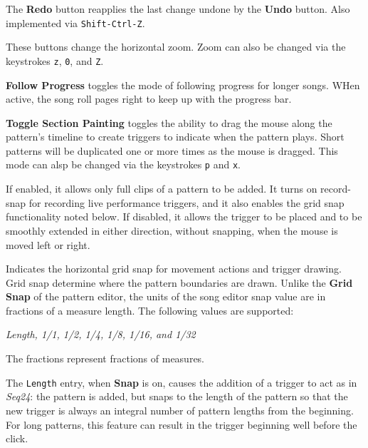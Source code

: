    The \textbf{Redo} button reapplies the last change undone by
   the \textbf{Undo} button.
   Also implemented via \texttt{Shift-Ctrl-Z}.

   These buttons change the horizontal zoom.
   Zoom can also be changed via the keystrokes \texttt{z}, \texttt{0},
   and \texttt{Z}.

   \textbf{Follow Progress} toggles the mode of following progress
   for longer songs.  WHen active, the song roll pages right to keep up with
   the progress bar.

   \textbf{Toggle Section Painting} toggles the ability
   to drag the mouse along the pattern's timeline to create triggers
   to indicate when the pattern plays.
   Short patterns will be duplicated one or more times as
   the mouse is dragged.
   This mode can alsp be changed via the keystrokes \texttt{p} and
   \texttt{x}.

   If enabled, it allows only full clips of a pattern to be added.
   It turns on record-snap for recording live performance triggers,
   and it also enables the grid snap functionality noted below.
   If disabled, it allows the trigger to be placed and to be smoothly extended
   in either direction, without snapping, when the mouse is moved left or
   right.

   Indicates the horizontal grid snap for movement actions and trigger drawing.
   Grid snap determine where the pattern boundaries are drawn.
   Unlike the \textbf{Grid Snap} of the pattern editor, the units
   of the song editor snap value are in fractions of a measure length.
   The following values are supported:

   \textsl{Length, 1/1, 1/2, 1/4, 1/8, 1/16, and 1/32}

   The fractions represent fractions of measures.

   The \texttt{Length} entry, when \textbf{Snap} is on, causes the addition of
   a trigger to act as in \textsl{Seq24}:  the pattern is added, but snaps to
   the length of the pattern so that the new trigger is always an integral
   number of pattern lengths from the beginning.  For long patterns, this
   feature can result in the trigger beginning well before the click.

